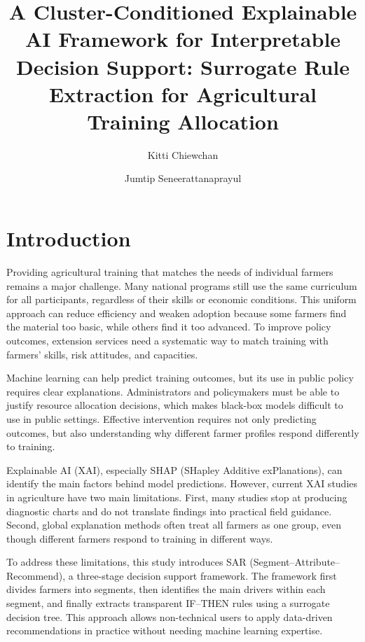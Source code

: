 \documentclass[fleqn,10pt,lineno]{wlpeerj}
\title{A Cluster-Conditioned Explainable AI Framework for Interpretable Decision Support: Surrogate Rule Extraction for Agricultural Training Allocation}
\author[1]{Kitti Chiewchan}
\author[2]{Jumtip Seneerattanaprayul}
\affil[1]{Computer Education Program, Faculty of Education, Bansomdejchaopraya Rajabhat University, Bangkok, Thailand}
\affil[2]{Department of Agricultural and Resource Economics, Faculty of Economics, Kasetsart University, Bangkok, Thailand}
\begin{document}
\flushbottom
\maketitle
\thispagestyle{empty}

\section*{Introduction}
Providing agricultural training that matches the needs of individual farmers remains a major challenge. Many national programs still use the same curriculum for all participants, regardless of their skills or economic conditions. This uniform approach can reduce efficiency and weaken adoption because some farmers find the material too basic, while others find it too advanced. To improve policy outcomes, extension services need a systematic way to match training with farmers' skills, risk attitudes, and capacities.

Machine learning can help predict training outcomes, but its use in public policy requires clear explanations. Administrators and policymakers must be able to justify resource allocation decisions, which makes black-box models difficult to use in public settings. Effective intervention requires not only predicting outcomes, but also understanding why different farmer profiles respond differently to training.

Explainable AI (XAI), especially SHAP (SHapley Additive exPlanations), can identify the main factors behind model predictions. However, current XAI studies in agriculture have two main limitations. First, many studies stop at producing diagnostic charts and do not translate findings into practical field guidance. Second, global explanation methods often treat all farmers as one group, even though different farmers respond to training in different ways.

To address these limitations, this study introduces SAR (Segment--Attribute--Recommend), a three-stage decision support framework. The framework first divides farmers into segments, then identifies the main drivers within each segment, and finally extracts transparent IF--THEN rules using a surrogate decision tree. This approach allows non-technical users to apply data-driven recommendations in practice without needing machine learning expertise.
\end{document}
